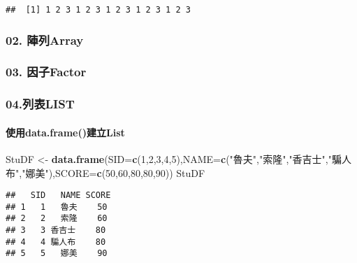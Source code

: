 \documentclass[
]{article}
\newenvironment{Shaded}{\begin{snugshade}}{\end{snugshade}}
\newcommand{\DataTypeTok}[1]{\textcolor[rgb]{0.13,0.29,0.53}{#1}}
\newcommand{\DecValTok}[1]{\textcolor[rgb]{0.00,0.00,0.81}{#1}}
\newcommand{\KeywordTok}[1]{\textcolor[rgb]{0.13,0.29,0.53}{\textbf{#1}}}
\newcommand{\NormalTok}[1]{#1}
\newcommand{\StringTok}[1]{\textcolor[rgb]{0.31,0.60,0.02}{#1}}
\begin{document}
\begin{verbatim}
##  [1] 1 2 3 1 2 3 1 2 3 1 2 3 1 2 3
\end{verbatim}

\hypertarget{ux9663ux5217array}{%
\subsubsection{\texorpdfstring{ 02.
陣列Array}{ 02. 陣列Array}}\label{ux9663ux5217array}}

\hypertarget{ux56e0ux5b50factor}{%
\subsubsection{\texorpdfstring{ 03.
因子Factor}{ 03. 因子Factor}}\label{ux56e0ux5b50factor}}

\hypertarget{ux5217ux8868list}{%
\subsubsection{\texorpdfstring{
04.列表LIST}{ 04.列表LIST}}\label{ux5217ux8868list}}

\hypertarget{ux4f7fux7528data.frameux5efaux7acblist}{%
\paragraph{使用data.frame()建立List}\label{ux4f7fux7528data.frameux5efaux7acblist}}

\begin{Shaded}
\begin{Highlighting}[]
\NormalTok{StuDF <-}\StringTok{ }\KeywordTok{data.frame}\NormalTok{(}\DataTypeTok{SID=}\KeywordTok{c}\NormalTok{(}\DecValTok{1}\NormalTok{,}\DecValTok{2}\NormalTok{,}\DecValTok{3}\NormalTok{,}\DecValTok{4}\NormalTok{,}\DecValTok{5}\NormalTok{),}\DataTypeTok{NAME=}\KeywordTok{c}\NormalTok{(}\StringTok{"魯夫"}\NormalTok{,}\StringTok{"索隆"}\NormalTok{,}\StringTok{"香吉士"}\NormalTok{,}\StringTok{"騙人布"}\NormalTok{,}\StringTok{"娜美"}\NormalTok{),}\DataTypeTok{SCORE=}\KeywordTok{c}\NormalTok{(}\DecValTok{50}\NormalTok{,}\DecValTok{60}\NormalTok{,}\DecValTok{80}\NormalTok{,}\DecValTok{80}\NormalTok{,}\DecValTok{90}\NormalTok{))}
\NormalTok{StuDF }
\end{Highlighting}
\end{Shaded}

\begin{verbatim}
##   SID   NAME SCORE
## 1   1   魯夫    50
## 2   2   索隆    60
## 3   3 香吉士    80
## 4   4 騙人布    80
## 5   5   娜美    90
\end{verbatim}
\end{document}
